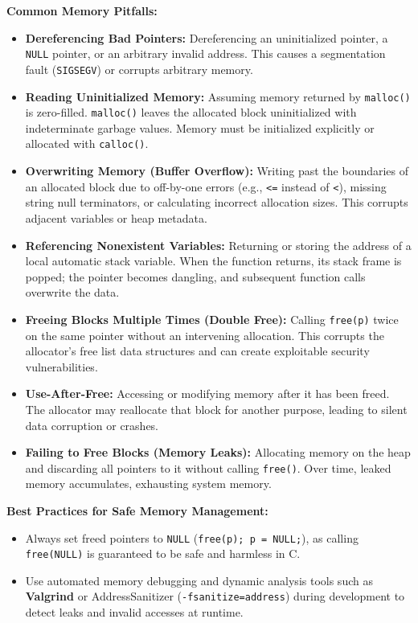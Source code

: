 \begin{definition}
    \textbf{Common Memory Pitfalls:}
    \begin{itemize}
        \item \textbf{Dereferencing Bad Pointers:} Dereferencing an uninitialized pointer, a \texttt{NULL} pointer, or an arbitrary invalid address. This causes a segmentation fault (\texttt{SIGSEGV}) or corrupts arbitrary memory.
        \item \textbf{Reading Uninitialized Memory:} Assuming memory returned by \texttt{malloc()} is zero-filled. \texttt{malloc()} leaves the allocated block uninitialized with indeterminate garbage values. Memory must be initialized explicitly or allocated with \texttt{calloc()}.
        \item \textbf{Overwriting Memory (Buffer Overflow):} Writing past the boundaries of an allocated block due to off-by-one errors (e.g., \texttt{<=} instead of \texttt{<}), missing string null terminators, or calculating incorrect allocation sizes. This corrupts adjacent variables or heap metadata.
        \item \textbf{Referencing Nonexistent Variables:} Returning or storing the address of a local automatic stack variable. When the function returns, its stack frame is popped; the pointer becomes dangling, and subsequent function calls overwrite the data.
        \item \textbf{Freeing Blocks Multiple Times (Double Free):} Calling \texttt{free(p)} twice on the same pointer without an intervening allocation. This corrupts the allocator's free list data structures and can create exploitable security vulnerabilities.
        \item \textbf{Use-After-Free:} Accessing or modifying memory after it has been freed. The allocator may reallocate that block for another purpose, leading to silent data corruption or crashes.
        \item \textbf{Failing to Free Blocks (Memory Leaks):} Allocating memory on the heap and discarding all pointers to it without calling \texttt{free()}. Over time, leaked memory accumulates, exhausting system memory.
    \end{itemize}
\end{definition}

\begin{remark}
    \textbf{Best Practices for Safe Memory Management:}
    \begin{itemize}
        \item Always set freed pointers to \texttt{NULL} (\texttt{free(p); p = NULL;}), as calling \texttt{free(NULL)} is guaranteed to be safe and harmless in C.
        \item Use automated memory debugging and dynamic analysis tools such as \textbf{Valgrind} or AddressSanitizer (\texttt{-fsanitize=address}) during development to detect leaks and invalid accesses at runtime.
    \end{itemize}
\end{remark}
